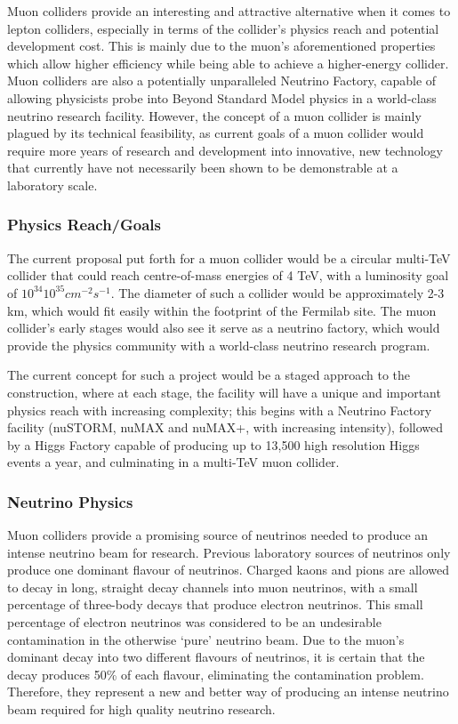 Muon colliders provide an interesting and attractive alternative when it comes to lepton colliders, especially in terms of the collider's physics reach and potential development cost. This is mainly due to the muon's aforementioned properties which allow higher efficiency while being able to achieve a higher-energy collider. Muon colliders are also a potentially unparalleled Neutrino Factory, capable of allowing physicists probe into Beyond Standard Model physics in a world-class neutrino research facility. However, the concept of a muon collider is mainly plagued by its technical feasibility, as current goals of a muon collider would require more years of research and development into innovative, new technology that currently have not necessarily been shown to be demonstrable at a laboratory scale.
 
\subsubsection{Physics Reach/Goals}
 
The current proposal put forth for a muon collider would be a circular multi-TeV collider that could reach centre-of-mass energies of 4 TeV, with a luminosity goal of $10^{34}$\textendash $10^{35} cm^{-2} s^{-1}$. The diameter of such a collider would be approximately 2-3 km, which would fit easily within the footprint of the Fermilab site. The muon collider's early stages would also see it serve as a neutrino factory, which would provide the physics community with a world-class neutrino research program.
 
The current concept for such a project would be a staged approach to the construction, where at each stage, the facility will have a unique and important physics reach with increasing complexity; this begins with a Neutrino Factory facility (nuSTORM, nuMAX and nuMAX+, with increasing intensity), followed by a Higgs Factory capable of producing up to 13,500 high resolution Higgs events a year, and culminating in a multi-TeV muon collider.
 
\subsubsection{Neutrino Physics}
 
Muon colliders provide a promising source of neutrinos needed to produce an intense neutrino beam for research. Previous laboratory sources of neutrinos only produce one dominant flavour of neutrinos. Charged kaons and pions are allowed to decay in long, straight decay channels into muon neutrinos, with a small percentage of three-body decays that produce electron neutrinos. This small percentage of electron neutrinos was considered to be an undesirable contamination in the otherwise `pure' neutrino beam. Due to the muon's dominant decay into two different flavours of neutrinos, it is certain that the decay produces 50\% of each flavour, eliminating the contamination problem. Therefore, they represent a new and better way of producing an intense neutrino beam required for high quality neutrino research.
 
